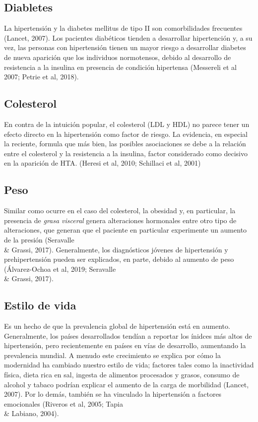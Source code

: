\documentclass{aa}
\begin{document}
\subsection{Diabletes}

La hipertensión y la diabetes mellitus de tipo II son comorbilidades frecuentes (Lancet, 2007). Los pacientes diabéticos tienden a desarrollar hipertención y, a su vez, las personas con hipertensión tienen un mayor riesgo a desarrollar diabetes de nueva aparición que los individuos normotensos, debido al desarrollo de resistencia a la insulina en presencia de condición hipertensa (Messereli et al 2007; Petrie et al, 2018).

\subsection{Colesterol}

En contra de la intuición popular, el colesterol (LDL y HDL) no parece tener un efecto directo en la hipertensión como factor de riesgo. La evidencia, en especial la reciente, formula que más bien, las posibles asociaciones se debe a la relación entre el colesterol y la resistencia a la insulina, factor considerado como decisivo en la aparición de HTA. (Heresi et al, 2010; Schillaci et al, 2001)

\subsection{Peso}

Similar como ocurre en el caso del colesterol, la obesidad y, en particular, la presencia de \textit{grasa visceral} genera alteraciones hormonales entre otro tipo de alteraciones, que generan que el paciente en particular experimente un aumento de la presión (Seravalle \\\& Grassi, 2017). Generalmente, los diagnósticos jóvenes de hipertensión y prehipertensión pueden ser explicados, en parte, debido al aumento de peso (Álvarez-Ochoa et al, 2019; Seravalle \\\& Grassi, 2017).

\subsection{Estilo de vida}

Es un hecho de que la prevalencia global de hipertensión está en aumento. Generalmente, los países desarrollados tendían a reportar los ínidces más altos de hipertensión, pero recientemente en países en vías de desarrollo, aumentando la prevalencia mundial. A menudo este crecimiento se explica por cómo la modernidad ha cambiado nuestro estilo de vida; factores tales como la inactividad física, dieta rica en sal, ingesta de alimentos procesados y grasos, consumo de alcohol y tabaco podrían explicar el aumento de la carga de morbilidad (Lancet, 2007). Por lo demás, también se ha vinculado la hipertensión a factores emocionales (Riveros et al, 2005; Tapia \\\& Labiano, 2004).
\end{document}
